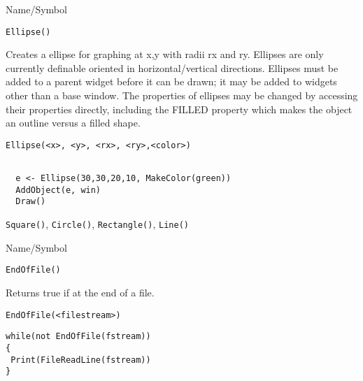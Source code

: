 \begin{desc}{Name/Symbol}
\item[Name/Symbol]	\verb+Ellipse()+
  
\item[Description]	Creates a ellipse for graphing at x,y with radii
  rx and ry. Ellipses are only currently definable oriented in
  horizontal/vertical directions.  Ellipses  must be added
  to a parent widget before it can be drawn; it may be added to
  widgets other than a base window.  The properties of ellipses may be
  changed by accessing their properties directly, including the FILLED
  property which makes the object an outline versus a filled shape.

\item[Usage]
\begin{verbatim}
Ellipse(<x>, <y>, <rx>, <ry>,<color>)
\end{verbatim}

\item[Example]	
\begin{verbatim}
  
  e <- Ellipse(30,30,20,10, MakeColor(green))
  AddObject(e, win)
  Draw()

\end{verbatim}
\item[See Also]	\verb+Square()+, \verb+Circle()+, \verb+Rectangle()+, \verb+Line()+
\end{desc}

\rl



\begin{desc}{Name/Symbol}
\item[Name/Symbol]	\verb+EndOfFile()+

\item[Description]	Returns true if at the end of a file.

\item[Usage]
\begin{verbatim}
EndOfFile(<filestream>)
\end{verbatim}

\item[Example]
\begin{verbatim}
while(not EndOfFile(fstream))
{
 Print(FileReadLine(fstream))
}
\end{verbatim}

\item[See Also]	
\end{desc}

\rl



